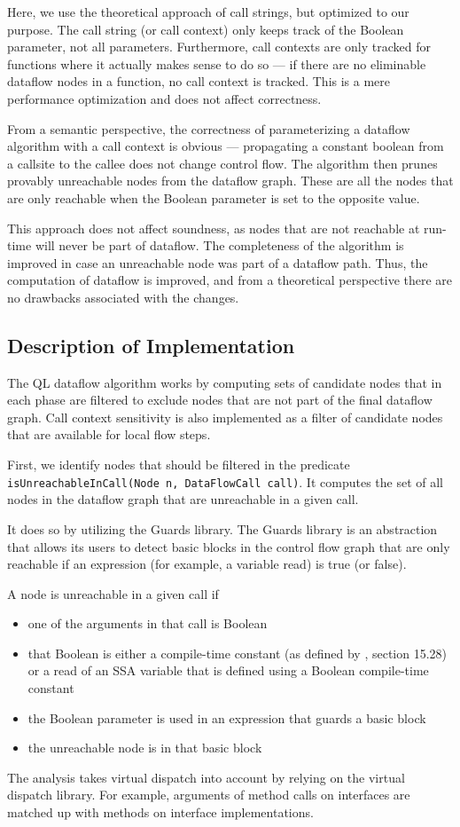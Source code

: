 Here, we use the theoretical approach of call strings, but optimized to our purpose.
The call string (or call context) only keeps track of the Boolean parameter, not
all parameters.
Furthermore, call contexts are only tracked for functions where it actually makes sense 
to do so --- if there are no eliminable dataflow nodes in a function,
no call context is tracked.
This is a mere performance optimization and does not affect correctness.

From a semantic perspective, the correctness of parameterizing a
dataflow algorithm with a call context is obvious ---
propagating a constant boolean from a callsite to the callee does not change 
control flow.
The algorithm then prunes provably unreachable nodes from the dataflow graph.
These are all the nodes that are only reachable when the Boolean parameter is set
to the opposite value.

This approach does not affect soundness,
as nodes that are not reachable at run-time will never be part of dataflow.
The completeness of the algorithm
is improved in case an unreachable node was part of a dataflow path.
Thus, the computation of dataflow is improved, and from a theoretical perspective 
there are no drawbacks associated with the changes.

\subsection{Description of Implementation}
The QL dataflow algorithm works by computing sets of candidate nodes that 
in each phase are filtered to exclude nodes that are not part of the final dataflow graph.
Call context sensitivity is also implemented as a filter of candidate nodes
that are available for local flow steps.

First, we identify nodes that should be filtered in the
predicate \texttt{isUnreachableInCall(Node n, DataFlowCall call)}.
It computes the set of all nodes in the dataflow graph that are unreachable
in a given call.

It does so by utilizing the Guards library.
The Guards library is an abstraction that allows its users to detect 
basic blocks in the control flow graph that are only reachable if an 
expression (for example, a variable read) is true (or false).

A node is unreachable in a given call if
\begin{itemize}
    \item one of the arguments in that call is Boolean
    \item that Boolean is either a compile-time constant (as defined by \cite{jls}, section 15.28)
    or a read of an SSA variable that is defined using a Boolean compile-time constant
    \item the Boolean parameter is used in an expression that guards a basic block
    \item the unreachable node is in that basic block
\end{itemize}
The analysis takes virtual dispatch into account by relying on the virtual
dispatch library.
For example, 
arguments of method calls on interfaces are matched up with methods 
on interface implementations.

